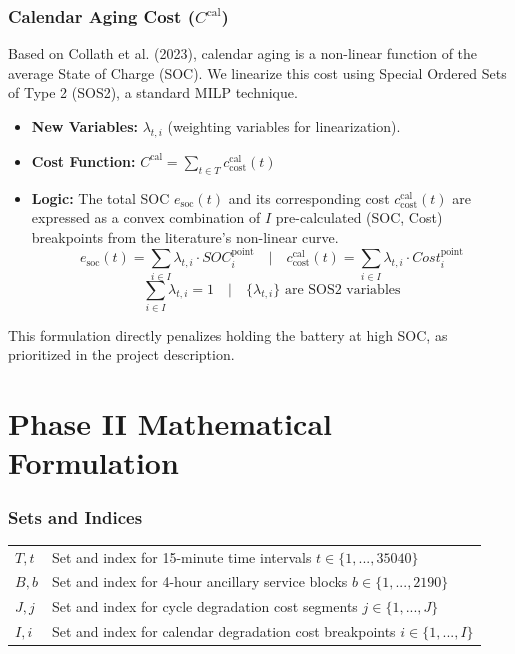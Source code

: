 \documentclass[11pt, a4paper]{article}
\begin{document}
\subsubsection{Calendar Aging Cost ($C^{\mathrm{cal}}$)}
Based on Collath et al. (2023), calendar aging is a non-linear function of the average State of Charge (SOC). We linearize this cost using Special Ordered Sets of Type 2 (SOS2), a standard MILP technique.
\begin{itemize}
    \item \textbf{New Variables:} $\lambda_{t,i}$ (weighting variables for linearization).
    \item \textbf{Cost Function:} $C^{\mathrm{cal}} = \sum_{t \in T} c^{\mathrm{cal}}_{\mathrm{cost}}(t)$
    \item \textbf{Logic:} The total SOC $e_{\mathrm{soc}}(t)$ and its corresponding cost $c^{\mathrm{cal}}_{\mathrm{cost}}(t)$ are expressed as a convex combination of $I$ pre-calculated (SOC, Cost) breakpoints from the literature's non-linear curve.
    $$ e_{\mathrm{soc}}(t) = \sum_{i \in I} \lambda_{t,i} \cdot SOC^{\mathrm{point}}_i \quad | \quad c^{\mathrm{cal}}_{\mathrm{cost}}(t) = \sum_{i \in I} \lambda_{t,i} \cdot Cost^{\mathrm{point}}_i $$
    $$ \sum_{i \in I} \lambda_{t,i} = 1 \quad | \quad \{\lambda_{t,i}\} \text{ are SOS2 variables} $$
\end{itemize}
This formulation directly penalizes holding the battery at high SOC, as prioritized in the project description.

\section{Phase II Mathematical Formulation}

\subsubsection{Sets and Indices}
\begin{tabular}{@{}ll}
\toprule
$T, t$ & Set and index for 15-minute time intervals $t \in \{1, ..., 35040\}$ \\
$B, b$ & Set and index for 4-hour ancillary service blocks $b \in \{1, ..., 2190\}$ \\
$J, j$ & Set and index for cycle degradation cost segments $j \in \{1, ..., J\}$ \\
$I, i$ & Set and index for calendar degradation cost breakpoints $i \in \{1, ..., I\}$ \\
\bottomrule
\end{tabular}
\end{document}
